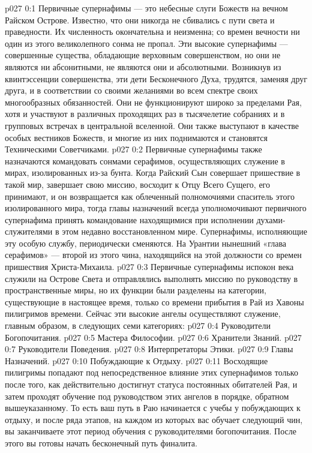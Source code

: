 \author{Совершенствователь Мудрости}
\vs p027 0:1 Первичные супернафимы --- это небесные слуги Божеств на вечном Райском Острове. Известно, что они никогда не сбивались с пути света и праведности. Их численность окончательна и неизменна; со времен вечности ни один из этого великолепного сонма не пропал. Эти высокие супернафимы --- совершенные существа, обладающие верховным совершенством, но они не являются ни абсонитными, не являются они и абсолютными. Возникнув из квинтэссенции совершенства, эти дети Бесконечного Духа, трудятся, заменяя друг друга, и в соответствии со своими желаниями во всем спектре своих многообразных обязанностей. Они не функционируют широко за пределами Рая, хотя и участвуют в различных проходящих раз в тысячелетие собраниях и в групповых встречах в центральной вселенной. Они также выступают в качестве особых вестников Божеств, и многие из них поднимаются и становятся Техническими Советчиками.
\vs p027 0:2 Первичные супернафимы также назначаются командовать сонмами серафимов, осуществляющих служение в мирах, изолированных из\hyp{}за бунта. Когда Райский Сын совершает пришествие в такой мир, завершает свою миссию, восходит к Отцу Всего Сущего, его принимают, и он возвращается как облеченный полномочиями спаситель этого изолированного мира, тогда главы назначений всегда уполномочивают первичного супернафима принять командование находящимися при исполнении духами\hyp{}служителями в этом недавно восстановленном мире. Супернафимы, исполняющие эту особую службу, периодически сменяются. На Урантии нынешний «глава серафимов» --- второй из этого чина, находящийся на этой должности со времен пришествия Христа\hyp{}Михаила.
\vs p027 0:3 Первичные супернафимы испокон века служили на Острове Света и отправлялись выполнять миссию по руководству в пространственные миры, но их функции были разделены на категории, существующие в настоящее время, только со времени прибытия в Рай из Хавоны пилигримов времени. Сейчас эти высокие ангелы осуществляют служение, главным образом, в следующих семи категориях:
\vs p027 0:4 \bibnobreakspace Руководители Богопочитания.
\vs p027 0:5 \bibnobreakspace Мастера Философии.
\vs p027 0:6 \bibnobreakspace Хранители Знаний.
\vs p027 0:7 \bibnobreakspace Руководители Поведения.
\vs p027 0:8 \bibnobreakspace Интерпретаторы Этики.
\vs p027 0:9 \bibnobreakspace Главы Назначений.
\vs p027 0:10 \bibnobreakspace Побуждающие к Отдыху.
\vs p027 0:11 Восходящие пилигримы попадают под непосредственное влияние этих супернафимов только после того, как действительно достигнут статуса постоянных обитателей Рая, и затем проходят обучение под руководством этих ангелов в порядке, обратном вышеуказанному. То есть ваш путь в Раю начинается с учебы у побуждающих к отдыху, и после ряда этапов, на каждом из которых вас обучает следующий чин, вы заканчиваете этот период обучения с руководителями богопочитания. После этого вы готовы начать бесконечный путь финалита.
